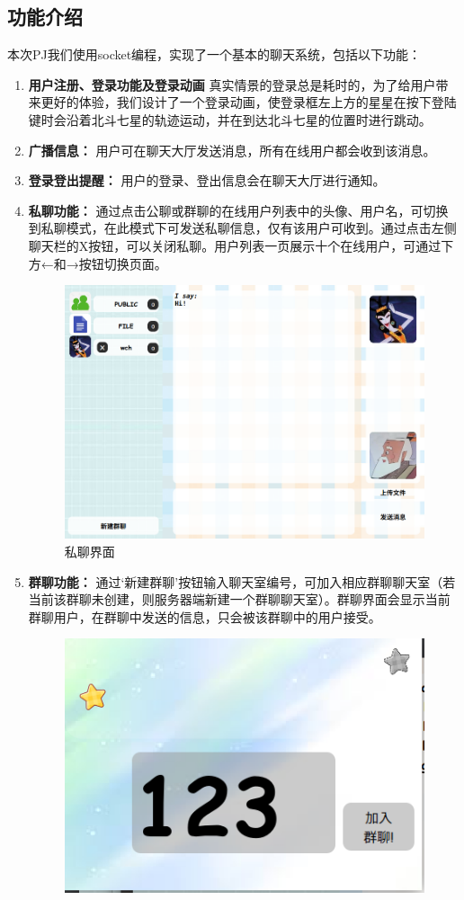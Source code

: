 \documentclass[12pt]{article} %
\begin{document}
\begin{sloppypar}
\subsection{功能介绍}

本次PJ我们使用socket编程，实现了一个基本的聊天系统，包括以下功能：
\begin{enumerate}
	\item {\bf 用户注册、登录功能及登录动画} 真实情景的登录总是耗时的，为了给用户带来更好的体验，我们设计了一个登录动画，使登录框左上方的星星在按下登陆键时会沿着北斗七星的轨迹运动，并在到达北斗七星的位置时进行跳动。
	\item {\bf 广播信息：} 用户可在聊天大厅发送消息，所有在线用户都会收到该消息。 
	\item {\bf 登录登出提醒：} 用户的登录、登出信息会在聊天大厅进行通知。
	\item {\bf 私聊功能：} 通过点击公聊或群聊的在线用户列表中的头像、用户名，可切换到私聊模式，在此模式下可发送私聊信息，仅有该用户可收到。通过点击左侧聊天栏的X按钮，可以关闭私聊。用户列表一页展示十个在线用户，可通过下方←和→按钮切换页面。
	\begin{figure}[htbp]
		\centering
		\includegraphics[width=0.7\linewidth]{figure/private.png}
		\caption{私聊界面}
	\end{figure}
	\item {\bf 群聊功能：} 通过‘新建群聊’按钮输入聊天室编号，可加入相应群聊聊天室（若当前该群聊未创建，则服务器端新建一个群聊聊天室）。群聊界面会显示当前群聊用户，在群聊中发送的信息，只会被该群聊中的用户接受。
	\begin{figure}[htbp]
		\centering
		\includegraphics[width=0.4\linewidth]{figure/group.png}

\end{figure}
\end{enumerate}
\end{sloppypar}
\end{document}
